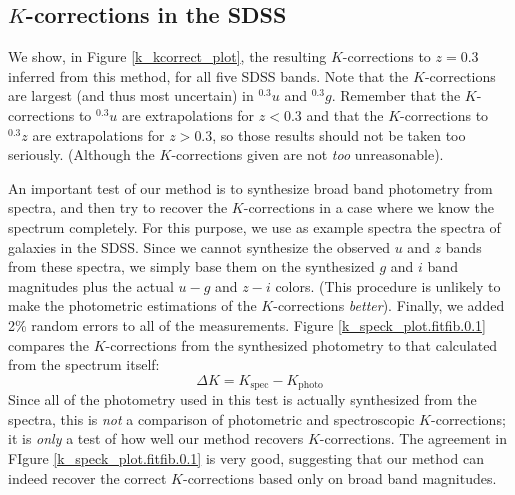 \documentclass[10pt,preprint]{aastex}
\newcommand{\band}[2]{\ensuremath{^{{#1}}\!{#2}}}
\begin{document}
\subsection{$K$-corrections in the SDSS}

We show, in Figure \ref{k_kcorrect_plot}, the resulting $K$-corrections to
$z=0.3$ inferred from this method, for all five SDSS bands. Note that
the $K$-corrections are largest (and thus most uncertain) in
$\band{0.3}{u}$ and $\band{0.3}{g}$. Remember that the $K$-corrections
to $\band{0.3}{u}$ are extrapolations for $z<0.3$ and that the
$K$-corrections to $\band{0.3}{z}$ are extrapolations for $z>0.3$, so
those results should not be taken too seriously. (Although the
$K$-corrections given are not {\it too} unreasonable).

An important test of our method is to synthesize broad band photometry
from spectra, and then try to recover the $K$-corrections in a case
where we know the spectrum completely. For this purpose, we use as
example spectra the spectra of galaxies in the SDSS.  Since we cannot
synthesize the observed $u$ and $z$ bands from these spectra, we
simply base them on the synthesized $g$ and $i$ band magnitudes plus
the actual $u-g$ and $z-i$ colors. (This procedure is unlikely to make
the photometric estimations of the $K$-corrections {\it
better}). Finally, we added 2\% random errors to all of the
measurements. Figure \ref{k_speck_plot.fitfib.0.1} compares the
$K$-corrections from the synthesized photometry to that calculated
from the spectrum itself:
\begin{equation}
\Delta K = K_{\mathrm{spec}} - K_{\mathrm{photo}}
\end{equation}
Since all of the photometry used in this test is actually synthesized
from the spectra, this is {\it not} a comparison of photometric and
spectroscopic $K$-corrections; it is {\it only} a test of how well our
method recovers $K$-corrections. The agreement in FIgure
\ref{k_speck_plot.fitfib.0.1} is very good, suggesting that our method
can indeed recover the correct $K$-corrections based only on broad
band magnitudes.
\end{document}
